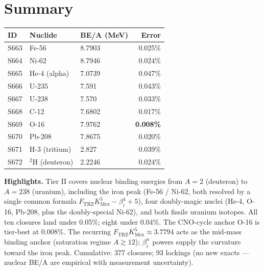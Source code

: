 \documentclass[11pt]{article}
\newcommand{\Ftrz}{F_{\mathrm{TRZ}}}
\newcommand{\KMex}{K_{\mathrm{Mex}}}
\newcommand{\betai}{\beta_i}
\begin{document}
\section*{Summary}
\begin{tabular}{lllr}
\toprule
ID & Nuclide & BE/A (MeV) & Error \\
\midrule
S663 & Fe-56 & 8.7903 & 0.025\% \\
S664 & Ni-62 & 8.7946 & 0.024\% \\
S665 & He-4 (alpha) & 7.0739 & 0.047\% \\
S666 & U-235 & 7.591 & 0.043\% \\
S667 & U-238 & 7.570 & 0.033\% \\
S668 & C-12 & 7.6802 & 0.017\% \\
S669 & O-16 & 7.9762 & \textbf{0.008\%} \\
S670 & Pb-208 & 7.8675 & 0.020\% \\
S671 & H-3 (tritium) & 2.827 & 0.039\% \\
S672 & $^{2}$H (deuteron) & 2.2246 & 0.024\% \\
\bottomrule
\end{tabular}

\medskip
\textbf{Highlights.} Tier II covers nuclear binding energies from $A=2$ (deuteron) to $A=238$ (uranium), including the iron peak (Fe-56 / Ni-62, both resolved by a single common formula $\Ftrz\KMex^{5}-\betai^{4}+5$), four doubly-magic nuclei (He-4, O-16, Pb-208, plus the doubly-special Ni-62), and both fissile uranium isotopes. All ten closures land under 0.05\%; eight under 0.04\%. The CNO-cycle anchor O-16 is tier-best at 0.008\%. The recurring $\Ftrz\KMex^{5} \approx 3.7794$ acts as the mid-mass binding anchor (saturation regime $A \gtrsim 12$); $\betai^{n}$ powers supply the curvature toward the iron peak. Cumulative: 377 closures; 93 lockings (no new exacts --- nuclear BE/A are empirical with measurement uncertainty).
\end{document}
